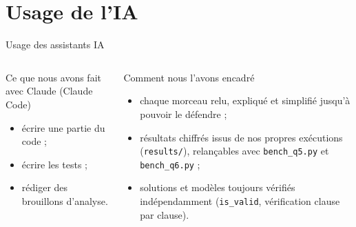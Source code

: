 \documentclass[aspectratio=169,11pt]{beamer}
\begin{document}
\section{Usage de l'IA}
\begin{frame}{Usage des assistants IA}
  \begin{columns}[T]
    \begin{block}{Ce que nous avons fait avec Claude (Claude Code)}
      \begin{itemize}\small
        \item écrire une partie du code ;
        \item écrire les tests ;
        \item rédiger des brouillons d'analyse.
      \end{itemize}
    \end{block}
    \begin{exampleblock}{Comment nous l'avons encadré}
      \begin{itemize}\small
        \item chaque morceau relu, expliqué et simplifié jusqu'à pouvoir le défendre ;
        \item résultats chiffrés issus de nos propres exécutions (\texttt{results/}), relançables avec \texttt{bench\_q5.py} et \texttt{bench\_q6.py} ;
        \item solutions et modèles toujours vérifiés indépendamment (\texttt{is\_valid}, vérification clause par clause).
      \end{itemize}
    \end{exampleblock}
  \end{columns}
\end{frame}
\end{document}
